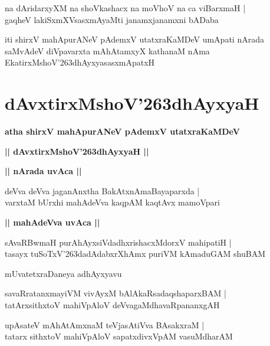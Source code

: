 \documentclass[twoside,12pt,openright]{book}
\def\S{\char'263}
\newcounter{shloka}[chapter]
\def\uvaca#1{\centerline{{\large\textbf{#1}}}}
\begin{document}
\begin{shloka}%
na dAridarxyXM na shoVkashacx na moVhoV na ca viBarxmaH |\\
gaqheV lakiSxmXVsasxmAyaMti janamxjanamxni bADaba
\end{shloka}

\begin{center}
iti shirxV mahApurANeV pAdemxV utatxraKaMDeV umApati nArada saMvAdeV  
diVpavarxta mAhAtamxyX kathanaM nAma EkatirxMshoV\S dhAyxyasasxmApatxH
\end{center}

\chapter{dAvxtirxMshoV\S dhAyxyaH}

\begin{center}
{\LARGE\bfseries atha shirxV mahApurANeV pAdemxV utatxraKaMDeV}
\end{center}

\begin{center}
{\LARGE\bfseries || dAvxtirxMshoV\S dhAyxyaH ||}
\end{center}

\uvaca{|| nArada uvAca ||}

\begin{shloka}%
deVva deVva jaganAnxtha BakAtxnAmaBayaparxda |\\
varxtaM bUrxhi mahAdeVva kaqpAM kaqtAvx mamoVpari
\end{shloka}

\uvaca{|| mahAdeVva uvAca ||}

\begin{shloka}%
sAvaRBwmaH purAhAyxsiVdadhxrishacxMdorxV mahipatiH |\\
tasayx tuSoTxV\S dadAdabxrXhAmx puriVM kAmaduGAM shuBAM 
\end{shloka}

\begin{center}
mUvatetxraDaneya adhAyxyavu
\end{center}

\begin{shloka}%
savaRratanxmayiVM vivAyxM bAlAkaRsadaqshaparxBAM |\\
tatArxsithxtoV mahiVpAloV deVvagaMdhavaRpananxgAH
\end{shloka}

\begin{shloka}%
upAsateV mAhAtAmxnaM teVjasAtiVva BAsakxraM |\\
tatarx sithxtoV mahiVpAloV sapatxdivxVpAM vasuMdharAM 
\end{shloka}
\end{document}
